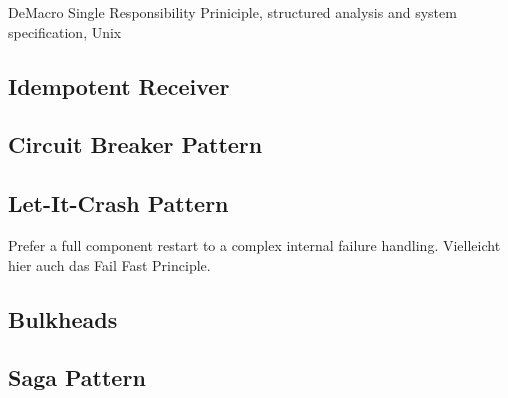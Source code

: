 DeMacro Single Responsibility Priniciple, structured analysis and system specification, Unix

\pagebreak

\subsection{Idempotent Receiver}

\pagebreak

\subsection{Circuit Breaker Pattern}

\pagebreak

\subsection{Let-It-Crash Pattern}

Prefer a full component restart to a complex internal failure handling. Vielleicht hier auch das Fail Fast Principle.

\pagebreak

\subsection{Bulkheads}

\pagebreak

\subsection{Saga Pattern}